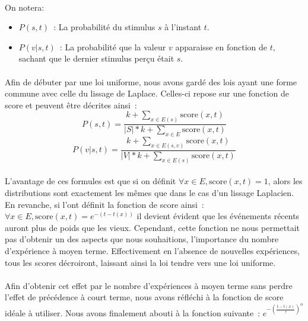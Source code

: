 \paragraph{}
On notera:
\begin{itemize}
\item $P(s, t)$~: La probabilité du stimulus $s$ à l'instant $t$.
\item $P(v|s, t)$~: La probabilité que la valeur $v$ apparaisse en fonction
      de $t$, sachant que le dernier stimulus perçu était $s$.
\end{itemize}
\paragraph{}
Afin de débuter par une loi uniforme, nous avons gardé des lois ayant une
forme commune avec celle du lissage de Laplace. Celles-ci repose sur une
fonction de score et peuvent être décrites ainsi~:
$$P(s,t) = \frac{k + \sum\limits_{x \in E(s)} \mathrm{score}(x, t)}
                {|S| * k + \sum\limits_{x \in E} \mathrm{score}(x, t)}$$
$$P(v| s, t) = \frac{k + \sum\limits_{x \in E(s, v)} \mathrm{score}(x, t)}
                {|V| * k + \sum\limits_{x \in E(s)} \mathrm{score}(x, t)}$$

\paragraph{}
L'avantage de ces formules est que si on définit
$\forall x \in E, \mathrm{score}(x, t) = 1$, alors les distributions sont
exactement les mêmes que dans le cas d'un lissage Laplacien. En revanche, si
l'ont définit la fonction de score ainsi~:
$\forall x \in E, \mathrm{score}(x, t) = e^{-(t - t(x))}$ il devient évident que
les événements récents auront plus de poids que les vieux. Cependant, cette
fonction ne nous permettait pas d'obtenir un des aspects que nous souhaitions,
l'importance du nombre d'expérience à moyen terme. Effectivement en l'absence
de nouvelles expériences, tous les scores décroiront, laissant ainsi la loi
tendre vers une loi uniforme.

\paragraph{}
Afin d'obtenir cet effet par le nombre d'expériences à moyen terme sans perdre
l'effet de précédence à court terme, nous avons réfléchi à la fonction de
score idéale à utiliser. Nous avons finalement abouti à la fonction suivante~:
$e^{-(\frac{t-t(x)}{\tau})^{\alpha}}$

